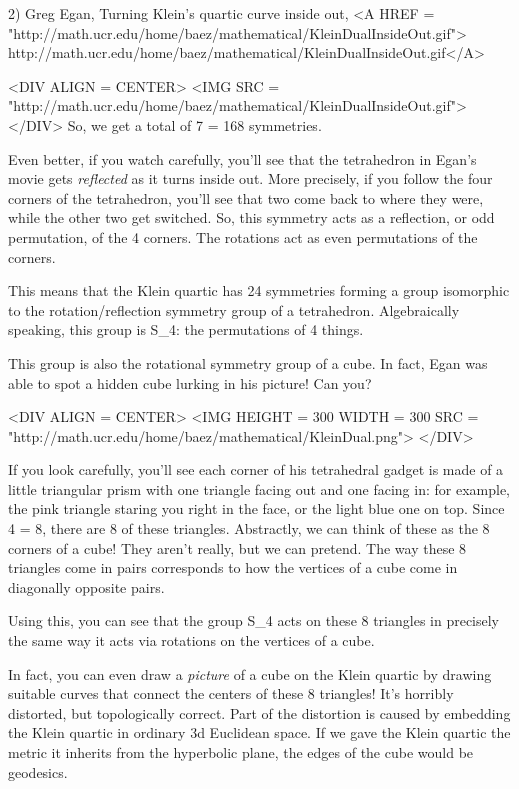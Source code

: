 2) Greg Egan, Turning Klein's quartic curve inside out,
<A HREF = "http://math.ucr.edu/home/baez/mathematical/KleinDualInsideOut.gif">
http://math.ucr.edu/home/baez/mathematical/KleinDualInsideOut.gif</A>


<DIV ALIGN = CENTER>
<IMG SRC = "http://math.ucr.edu/home/baez/mathematical/KleinDualInsideOut.gif">
</DIV>
So, we get a total of 7  = 168 symmetries. 

Even better, if you watch carefully, you'll see that the tetrahedron 
in Egan's movie gets \emph{reflected} as it turns inside out.  More 
precisely, if you follow the four corners of the tetrahedron, 
you'll see that two come back to where they were, while the other 
two get switched.  So, this symmetry acts as a reflection, or odd 
permutation, of the 4 corners.  The rotations act as even permutations 
of the corners.

This means that the Klein quartic has 24 symmetries forming a group
isomorphic to the rotation/reflection symmetry group of a tetrahedron.
Algebraically speaking, this group is S_{4}: 
the permutations of 4 things.

This group is also the rotational symmetry group of a cube.  In fact, 
Egan was able to spot a hidden cube lurking in his picture!  Can you?

<DIV ALIGN = CENTER>
<IMG HEIGHT = 300 WIDTH = 300 
SRC = "http://math.ucr.edu/home/baez/mathematical/KleinDual.png">
</DIV>

If you look carefully, you'll see each corner of his tetrahedral
gadget is made of a little triangular prism with one triangle facing 
out and one facing in: for example, the pink triangle
staring you right in the face, or the light blue one on top.
Since 4  = 8, there are 8 of these triangles.  
Abstractly, we can think of these as the 8 corners of a cube!  They 
aren't really, but we can pretend.  The way these 8 triangles come 
in pairs corresponds to how the vertices of a cube come in diagonally 
opposite pairs.  

Using this, you can see that the group S_{4} acts on these 8 triangles 
in precisely the same way it acts via rotations on the vertices of a 
cube.

In fact, you can even draw a \emph{picture} of a cube on the Klein quartic by 
drawing suitable curves that connect the centers of these 8 triangles!
It's horribly distorted, but topologically correct.  Part of the 
distortion is caused by embedding the Klein quartic in ordinary
3d Euclidean space.  If we gave the Klein quartic the metric it 
inherits from the hyperbolic plane, the edges of the cube would be 
geodesics.


